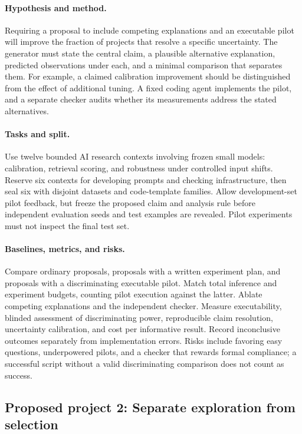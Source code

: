 \paragraph{Hypothesis and method.}
Requiring a proposal to include competing explanations and an executable pilot will improve the fraction of projects that resolve a specific uncertainty. The generator must state the central claim, a plausible alternative explanation, predicted observations under each, and a minimal comparison that separates them. For example, a claimed calibration improvement should be distinguished from the effect of additional tuning. A fixed coding agent implements the pilot, and a separate checker audits whether its measurements address the stated alternatives.

\paragraph{Tasks and split.}
Use twelve bounded AI research contexts involving frozen small models: calibration, retrieval scoring, and robustness under controlled input shifts. Reserve six contexts for developing prompts and checking infrastructure, then seal six with disjoint datasets and code-template families. Allow development-set pilot feedback, but freeze the proposed claim and analysis rule before independent evaluation seeds and test examples are revealed. Pilot experiments must not inspect the final test set.

\paragraph{Baselines, metrics, and risks.}
Compare ordinary proposals, proposals with a written experiment plan, and proposals with a discriminating executable pilot. Match total inference and experiment budgets, counting pilot execution against the latter. Ablate competing explanations and the independent checker. Measure executability, blinded assessment of discriminating power, reproducible claim resolution, uncertainty calibration, and cost per informative result. Record inconclusive outcomes separately from implementation errors. Risks include favoring easy questions, underpowered pilots, and a checker that rewards formal compliance; a successful script without a valid discriminating comparison does not count as success.

\subsection{Proposed project 2: Separate exploration from selection}

